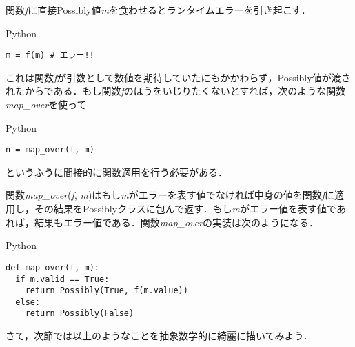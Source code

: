 \documentclass[a5paper,draft]{jsbook}
\newcommand{\programminglanguage}[1]{\textsf{#1}}
\newcommand{\python}{\programminglanguage{Python}}
\newenvironment{pythoncode}{\begin{itembox}[r]{\python}}{\end{itembox}}
\newcommand{\pthnClassname}[1]{\textrm{#1}}
\newcommand{\pthnId}[1]{\textit{#1}}
\newcommand{\pthnKeyword}[1]{\textbf{#1}}
\newcommand{\pthnOp}[1]{\texttt{#1}}
\begin{document}
関数\pthnId{f}に直接\pthnClassname{Possibly}値\pthnId{m}を食わせるとランタイムエラーを引き起こす．
\begin{pythoncode}
\begin{verbatim}
m = f(m) # エラー!!
\end{verbatim}
\end{pythoncode}
これは関数\pthnId{f}が引数として数値を期待していたにもかかわらず，\pthnClassname{Possibly}値が渡されたからである．もし関数\pthnId{f}のほうをいじりたくないとすれば，次のような関数\pthnId{map\_over}を使って
\begin{pythoncode}
\begin{verbatim}
n = map_over(f, m)
\end{verbatim}
\end{pythoncode}
というふうに間接的に関数適用を行う必要がある．

関数\pthnId{map\_over}(\pthnId{f}, \pthnId{m})はもし\pthnId{m}がエラーを表す値でなければ中身の値を関数\pthnId{f}に適用し，その結果を\pthnClassname{Possibly}クラスに包んで返す．もし\pthnId{m}がエラー値を表す値であれば，結果もエラー値である．関数\pthnId{map\_over}の実装は次のようになる．
\begin{pythoncode}
\begin{verbatim}
def map_over(f, m):
  if m.valid == True:
    return Possibly(True, f(m.value))
  else:
    return Possibly(False)
\end{verbatim}
\end{pythoncode}

さて，次節では以上のようなことを抽象数学的に綺麗に描いてみよう．
\end{document}
